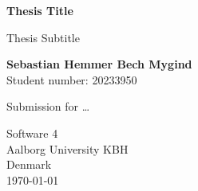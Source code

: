 \begin{titlepage}
   \begin{center}
       \vspace*{1cm}
       \Huge
       \textbf{Thesis Title}

       \LARGE
       \vspace{0.5cm}
        Thesis Subtitle

       \vspace{1.5cm}

       \textbf{Sebastian Hemmer Bech Mygind} \\
       Student number: 20233950

       \vfill

       Submission for \dots

       \vspace{2.5cm}

       Software 4\\
       Aalborg University KBH\\
       Denmark\\
       \today

   \end{center}
\end{titlepage}
